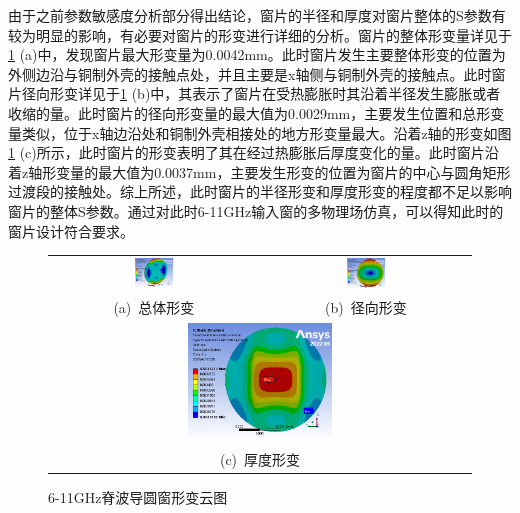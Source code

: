 \documentclass[master]{thesis-uestc}
\begin{document}
由于之前参数敏感度分析部分得出结论，窗片的半径和厚度对窗片整体的S参数有较为明显的影响，有必要对窗片的形变进行详细的分析。窗片的整体形变量详见于\ref{fig:X输入窗形变} (a)中，发现窗片最大形变量为0.0042mm。此时窗片发生主要整体形变的位置为外侧边沿与铜制外壳的接触点处，并且主要是x轴侧与铜制外壳的接触点。此时窗片径向形变详见于\ref{fig:X输入窗形变} (b)中，其表示了窗片在受热膨胀时其沿着半径发生膨胀或者收缩的量。此时窗片的径向形变量的最大值为0.0029mm，主要发生位置和总形变量类似，位于x轴边沿处和铜制外壳相接处的地方形变量最大。沿着z轴的形变如图\ref{fig:X输入窗形变} (c)所示，此时窗片的形变表明了其在经过热膨胀后厚度变化的量。此时窗片沿着z轴形变量的最大值为0.0037mm，主要发生形变的位置为窗片的中心与圆角矩形过渡段的接触处。综上所述，此时窗片的半径形变和厚度形变的程度都不足以影响窗片的整体S参数。通过对此时6-11GHz输入窗的多物理场仿真，可以得知此时的窗片设计符合要求。
\begin{figure}[!htb]
    \small
    \centering
    \begin{tabular}{@{\ }c@{\ }c}
        \includegraphics[width=0.19\textwidth]{pic/chapter3/X输入窗总形变.png} & 
        \hspace{5pt}
        \includegraphics[width=0.19\textwidth]{pic/chapter3/X输入窗径向形变.png}     \\
        \mbox{\small (a) 总体形变}                                                                               & 
        \mbox{\small (b) 径向形变}                                                           \\[6bp]
        \multicolumn{2}{c}{\includegraphics[width=0.35\textwidth]{pic/chapter3/X输入窗厚度形变.png}} \\  %
        \multicolumn{2}{c}{\mbox{\small (c) 厚度形变}}             
    \end{tabular}
    \caption{6-11GHz脊波导圆窗形变云图}
    \label{fig:X输入窗形变}
\end{figure}
        
\end{document}
